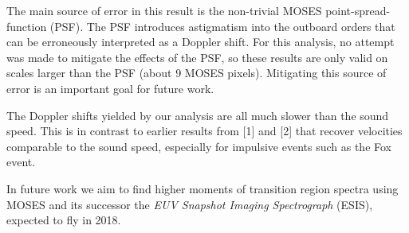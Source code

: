 \documentclass[landscape,paperwidth=46truein,paperheight=41truein,fontscale=0.3]{baposter}
\begin{document}
\begin{poster}
{\begin{center}
\begin{minipage}{0.95 \columnwidth}
			\hspace{8pt}The main source of error in this result is the non-trivial MOSES point-spread-function (PSF). The PSF introduces astigmatism into the outboard orders that can be erroneously interpreted as a Doppler shift. For this analysis, no attempt was made to mitigate the effects of the PSF, so these results are only valid on scales larger than the PSF (about 9 MOSES pixels). Mitigating this source of error is an important goal for future work.
			
			\hspace{8pt}The Doppler shifts yielded by our analysis are all much slower than the sound speed. This is in contrast to earlier results from [1] and [2] that recover velocities comparable to the sound speed, especially for impulsive events such as the Fox event.
			
			\hspace{8pt} In future work we aim to find higher moments of transition region spectra using MOSES and its successor the \textit{EUV Snapshot Imaging Spectrograph} (ESIS), expected to fly in 2018.

		\end{minipage}
	\end{center}
	\vspace{0pt}
}




\end{poster}
\end{document}
